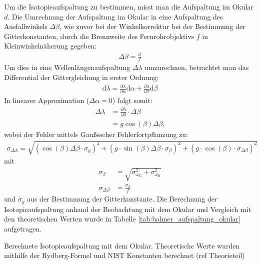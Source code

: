 \documentclass[11pt, a4paper]{article}
\numberwithin{equation}{section}
\begin{document}
Um die Isotopieaufspaltung zu bestimmen, misst man die Aufspaltung im Okular $d$.
Die Umrechnung der Aufspaltung im Okular in eine Aufspaltung des Ausfallwinkels $\Delta \beta$, wie zuvor bei der Winkelkorrektur bei der Bestimmung der Gitterkonstanten, durch die Brennweite des Fernrohrobjektivs $f$ in Kleinwinkelnäherung gegeben:
\begin{align*}
  \Delta \beta = \frac{d}{f}
\end{align*}
Um dies in eine Wellenlängenaufspaltung $\Delta \lambda$ umzurechnen, betrachtet man das Differential der Gittergleichung in erster Ordnung:
\begin{align*}
  \mathrm{d}\lambda = \frac{\partial \lambda}{\partial \alpha} \mathrm{d}\alpha + \frac{\partial \lambda}{\partial \beta} \mathrm{d}\beta
\end{align*}
In linearer Approximation ($\Delta \alpha = \num{0}$) folgt somit:
\begin{align*}
  \Delta \lambda &= \frac{\partial \lambda}{\partial \beta} \cdot \Delta \beta \\
  &= g \cos(\beta) \Delta \beta \text{,}
\end{align*}
wobei der Fehler mittels Gaußsscher Fehlerfortpflanzung zu:
\begin{align*}
	\sigma_{\Delta \lambda} = \sqrt{\left( \cos(\beta) \Delta \beta \cdot \sigma_g \right)^2 + \left( g \cdot \sin(\beta) \Delta \beta \cdot \sigma_\beta \right)^2 + \left( g \cdot \cos(\beta) \cdot \sigma_{\Delta \beta}\right)^2}
\end{align*}
mit
\begin{align*}
	\sigma_\beta &= \sqrt{\sigma_{\omega_\mathrm{G}}^2 + \sigma_{\omega_\mathrm{B}}^2} \\
	\sigma_{\Delta \beta} &= \frac{\sigma_d}{f}
\end{align*}
und $\sigma_g$ aus der Bestimmung der Gitterkonstante.
Die Berechnung der Isotopieaufspaltung anhand der Beobachtung mit dem Okular und Vergleich mit den theoretischen Werten wurde in Tabelle \ref{tab:balmer_aufspaltung_okular} aufgetragen.
\begin{table}[h]
	\centering
	
	\caption{Berechnete Isotopieaufspaltung mit dem Okular. Theoretische Werte wurden mithilfe der Rydberg-Formel und NIST Konstanten berechnet (ref Theorieteil)}
	\label{tab:balmer_aufspaltung_okular}
\end{table}
\end{document}
